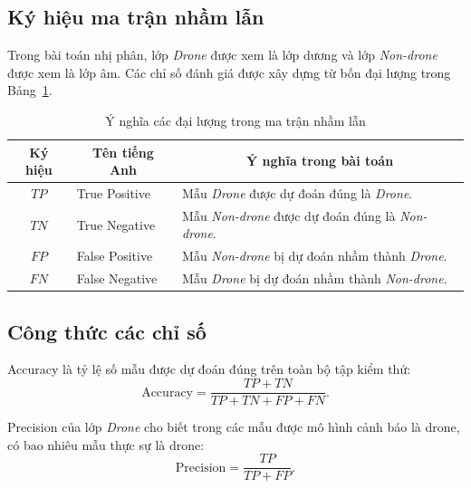\documentclass[../DoAn.tex]{subfiles}
\begin{document}
\subsection{Ký hiệu ma trận nhầm lẫn}

Trong bài toán nhị phân, lớp \textit{Drone} được xem là lớp dương và lớp \textit{Non-drone} được xem là lớp âm. Các chỉ số đánh giá được xây dựng từ bốn đại lượng trong Bảng~\ref{tab:confusion_terms}.

\begin{table}[H]
    \centering
    \caption{Ý nghĩa các đại lượng trong ma trận nhầm lẫn}
    \label{tab:confusion_terms}
    \renewcommand{\arraystretch}{1.3}
    \small
    \begin{tabular}{|c|p{}|p{}|}
        \hline
        \textbf{Ký hiệu} & \multicolumn{1}{c|}{\textbf{Tên tiếng Anh}} & \multicolumn{1}{c|}{\textbf{Ý nghĩa trong bài toán}} \\ \hline
        $TP$ & True Positive & Mẫu \textit{Drone} được dự đoán đúng là \textit{Drone}. \\ \hline
        $TN$ & True Negative & Mẫu \textit{Non-drone} được dự đoán đúng là \textit{Non-drone}. \\ \hline
        $FP$ & False Positive & Mẫu \textit{Non-drone} bị dự đoán nhầm thành \textit{Drone}. \\ \hline
        $FN$ & False Negative & Mẫu \textit{Drone} bị dự đoán nhầm thành \textit{Non-drone}. \\ \hline
    \end{tabular}
\end{table}

\subsection{Công thức các chỉ số}

Accuracy là tỷ lệ số mẫu được dự đoán đúng trên toàn bộ tập kiểm thử:
\begin{equation}
    \mathrm{Accuracy}
    =
    \frac{TP+TN}{TP+TN+FP+FN}.
    \label{eq:accuracy_ch4}
\end{equation}

Precision của lớp \textit{Drone} cho biết trong các mẫu được mô hình cảnh báo là drone, có bao nhiêu mẫu thực sự là drone:
\begin{equation}
    \mathrm{Precision}
    =
    \frac{TP}{TP+FP}.
    \label{eq:precision_ch4}
\end{equation}
\end{document}
